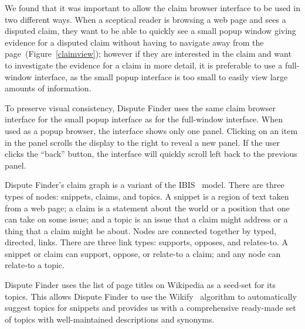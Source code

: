 \documentclass{www2010-submission}
\newcommand{\todo}[1]{}
\begin{document}

We found that it was important to allow the claim browser interface to be used in two different ways. When a sceptical reader is browsing a web page and sees a disputed claim, they want to be able to quickly see a small popup window giving evidence for a disputed claim without having to navigate away from the page~(Figure~\ref{claimview}); however if they are interested in the claim and want to investigate the evidence for a claim in more detail, it is preferable to use a full-window interface, as the small popup interface is too small to easily view large amounts of information.

To preserve visual consistency, Dispute Finder uses the same claim browser interface for the small popup interface as for the full-window interface. When used as a popup browser, the interface shows only one panel. Clicking on an item in the panel scrolls the display to the right to reveal a new panel. If the user clicks the ``back'' button, the interface will quickly scroll left back to the previous panel.


Dispute Finder's claim graph is a variant of the IBIS~\cite{Rittel1973} model. There are three types of nodes: snippets, claims, and topics. 
A snippet is a region of text taken from a web page; a claim is a statement about the world or a position that one can take on some issue; and a topic is an issue that a claim might address or a thing that a claim might be about. Nodes are connected together by typed, directed, links. 
There are three link types: supports, opposes, and relates-to. A snippet or claim can support, oppose, or relate-to a claim; and any node can relate-to a topic. 

Dispute Finder uses the list of page titles on Wikipedia as a seed-set for its topics. This allows Dispute Finder to use the Wikify~\cite{Mihalcea2007} algorithm to automatically suggest topics for snippets and provides us with a comprehensive ready-made set of topics with well-maintained descriptions and synonyms.
\end{document}
